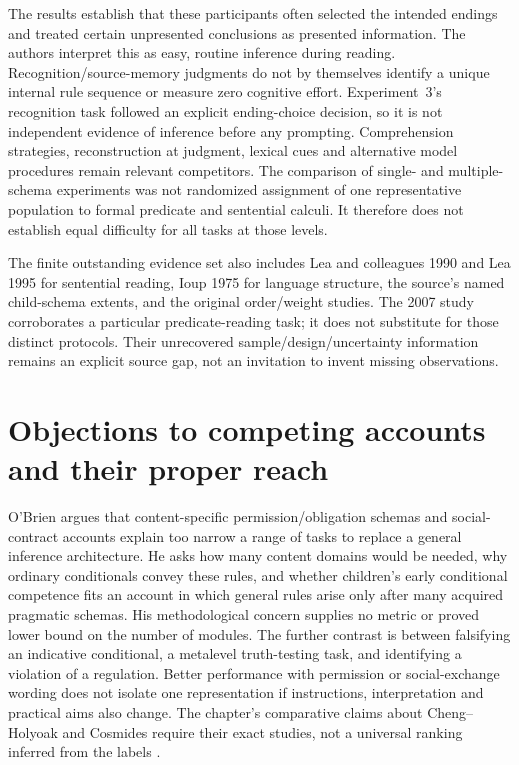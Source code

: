 The results establish that these participants often selected the intended
endings and treated certain unpresented conclusions as presented
information. The authors interpret this as easy, routine inference during
reading. Recognition/source-memory judgments do not by themselves
identify a unique internal rule sequence or measure zero cognitive effort.
Experiment~3's recognition task followed an explicit ending-choice decision,
so it is not independent evidence of inference before any prompting.
Comprehension strategies, reconstruction at judgment, lexical cues and
alternative model procedures remain relevant competitors. The comparison
of single- and multiple-schema experiments was not randomized assignment
of one representative population to formal predicate and sentential
calculi. It therefore does not establish equal difficulty for all tasks
at those levels.

The finite outstanding evidence set also includes Lea and colleagues
1990 and Lea 1995 for sentential reading, Ioup 1975 for language structure,
the source's named child-schema extents, and the original order/weight
studies. The 2007 study corroborates a particular predicate-reading task;
it does not substitute for those distinct protocols. Their unrecovered
sample/design/uncertainty information remains an explicit source gap,
not an invitation to invent missing observations.

\section{Objections to competing accounts and their proper reach}
\label{sec:p19-r32-comparisons}

O'Brien argues that content-specific permission/obligation schemas and
social-contract accounts explain too narrow a range of tasks to replace
a general inference architecture. He asks how many content domains would
be needed, why ordinary conditionals convey these rules, and whether
children's early conditional competence fits an account in which general
rules arise only after many acquired pragmatic schemas. His methodological
concern supplies no metric or proved lower bound on the number of modules.
The further
contrast is between falsifying an indicative conditional, a metalevel
truth-testing task, and identifying a violation of a regulation. Better
performance with permission or social-exchange wording does not isolate
one representation if instructions, interpretation and practical aims
also change. The chapter's comparative claims about Cheng--Holyoak and
Cosmides require their exact studies, not a universal ranking inferred
from the labels \cite[pp.~220--221]{OBrien2021NaturalLogic}.

